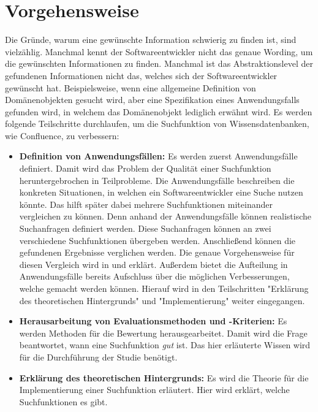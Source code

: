 \section{Vorgehensweise}
Die Gründe, warum eine gewünschte Information schwierig zu finden ist, sind vielzählig.
Manchmal kennt der Softwareentwickler nicht das genaue Wording, um die gewünschten Informationen zu finden.
Manchmal ist das Abstraktionslevel der gefundenen Informationen nicht das, welches sich der Softwareentwickler gewünscht hat.
Beispielsweise, wenn eine allgemeine Definition von Domänenobjekten gesucht wird, aber eine Spezifikation eines Anwendungsfalls gefunden wird, in welchem das Domänenobjekt lediglich erwähnt wird.
Es werden folgende Teilschritte durchlaufen, um die Suchfunktion von Wissensdatenbanken, wie Confluence, zu verbessern:
\begin{itemize}
   \item \textbf{Definition von Anwendungsfällen:}
         Es werden zuerst Anwendungsfälle definiert.
         Damit wird das Problem der Qualität einer Suchfunktion heruntergebrochen in Teilprobleme.
         Die Anwendungsfälle beschreiben die konkreten Situationen, in welchen ein Softwareentwickler eine Suche nutzen könnte.
         Das hilft später dabei mehrere Suchfunktionen miteinander vergleichen zu können.
         Denn anhand der Anwendungsfälle können realistische Suchanfragen definiert werden.
         Diese Suchanfragen können an zwei verschiedene Suchfunktionen übergeben werden.
         Anschließend können die gefundenen Ergebnisse verglichen werden.
         Die genaue Vorgehensweise für diesen Vergleich wird in  und  erklärt.
         Außerdem bietet die Aufteilung in Anwendungsfälle bereits Aufschluss über die möglichen Verbesserungen, welche gemacht werden können.
         Hierauf wird in den Teilschritten "Erklärung des theoretischen Hintergrunds" und "Implementierung" weiter eingegangen.
   \item \textbf{Herausarbeitung von Evaluationsmethoden und -Kriterien:}
         Es werden Methoden für die Bewertung herausgearbeitet.
         Damit wird die Frage beantwortet, wann eine Suchfunktion \textit{gut} ist.
         Das hier erläuterte Wissen wird für die Durchführung der Studie benötigt.
   \item \textbf{Erklärung des theoretischen Hintergrunds:}
         Es wird die Theorie für die Implementierung einer Suchfunktion erläutert.
         Hier wird erklärt, welche Suchfunktionen es gibt.

\end{itemize}
